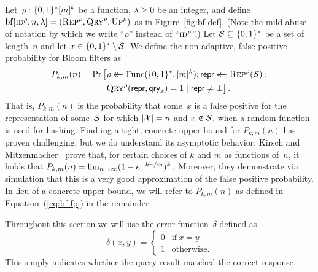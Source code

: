 Let~$\rho:\{0,1\}^*[m]^k$ be a function, $\lambda\geq0$ be an integer, and
define $\mathrm{bf}[\textnormal{\textsc{id}}^\rho,n,\lambda] = (\textnormal{\textsc{Rep}}^\rho, \textnormal{\textsc{Qry}}^\rho, \textnormal{\textsc{Up}}^\rho)$ as in
Figure~\ref{fig:bf-def}. (Note the mild abuse of notation by which we write
``$\rho$'' instead of ``$\textnormal{\textsc{id}}^\rho$''.)
%
Let $\mathcal{S}\subseteq\{0,1\}^*$ be a set of length~$n$ and let
$x\in\{0,1\}^*\setminus\mathcal{S}$. We define the non-adaptive, false positive
probability for Bloom filters as
\begin{equation}\label{eq:bf-fp}
  \begin{aligned}
    P_{k,m}(n) =
      \Pr\big[&\rho \mathrel{\leftarrow\mkern-14mu\leftarrow} \mathrm{Func}(\{0,1\}^*,[m]^k);
              \mathsf{repr} \mathrel{\leftarrow\mkern-14mu\leftarrow} \textnormal{\textsc{Rep}}^\rho(\mathcal{S}): \\
              &\textnormal{\textsc{Qry}}^\rho(\mathsf{repr}, \mathsf{qry}_x) = 1 \mid \mathsf{repr} \ne \bot
      \big] \,.
  \end{aligned}
\end{equation}
%
%
That is, $P_{k,m}(n)$ is the probability that some~$x$ is a false positive for
the representation of some~$\mathcal{S}$ for which $|\mathcal{X}|=n$ and $x\not\in\mathcal{S}$,
when a random function is used for hashing.
%
Findiing a tight, concrete upper bound for $P_{k,m}(n)$ has proven challenging,
but we do understand its asymptotic behavior. Kirsch and
Mitzenmacher~\cite{kirsch2006less} prove that, for certain choices of $k$ and
$m$ as functions of~$n$, it holds that
$
  P_{k,m}(n) = \lim_{n{\rightarrow}\infty} (1-e^{-kn/m})^k \,.
$
%
Moreover, they demonstrate via simulation that this is a very good approximation
of the false positive probability.
%
In lieu of a concrete upper bound, we will refer to $P_{k,m}(n)$ as defined in
Equation~(\ref{eq:bf-fp}) in the remainder.

%
Throughout this section we will use the error function~$\delta$ defined as
\begin{equation}
  \delta(x, y) =
  \begin{cases}
    0 & \text{if}\ x=y \\
    1 & \text{otherwise.}
  \end{cases}
\end{equation}
This simply indicates whether the query result matched the correct response.

